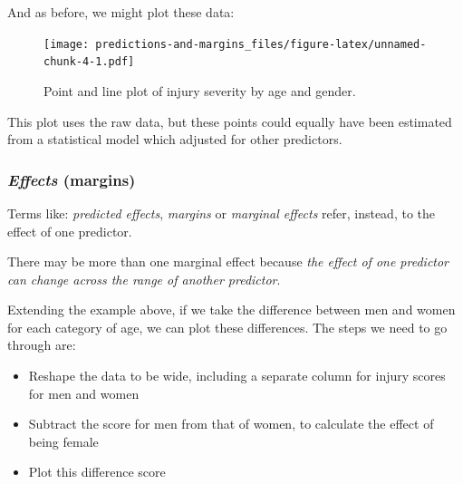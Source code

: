 \documentclass[]{article}
\providecommand{\tightlist}{%
  \setlength{\itemsep}{0pt}\setlength{\parskip}{0pt}}
\begin{document}
And as before, we might plot these data:

\begin{figure}
\centering
\texttt{[image: predictions-and-margins\_files/figure-latex/unnamed-chunk-4-1.pdf]}
\caption{\label{fig:unnamed-chunk-4}Point and line plot of injury severity by age and gender.}
\end{figure}

This plot uses the raw data, but these points could equally have been estimated
from a statistical model which adjusted for other predictors.

\hypertarget{effects-margins}{%
\subsubsection*{\texorpdfstring{\emph{Effects} (margins)}{Effects (margins)}}\label{effects-margins}}

Terms like: \emph{predicted effects}, \emph{margins} or \emph{marginal effects} refer, instead,
to the effect of one predictor.

There may be more than one marginal effect because \emph{the effect of one predictor
can change across the range of another predictor}.

Extending the example above, if we take the difference between men and women for
each category of age, we can plot these differences. The steps we need to go
through are:

\begin{itemize}
\tightlist
\item
  Reshape the data to be wide, including a separate column for injury scores
  for men and women
\item
  Subtract the score for men from that of women, to calculate the effect of
  being female
\item
  Plot this difference score
\end{itemize}
\end{document}
